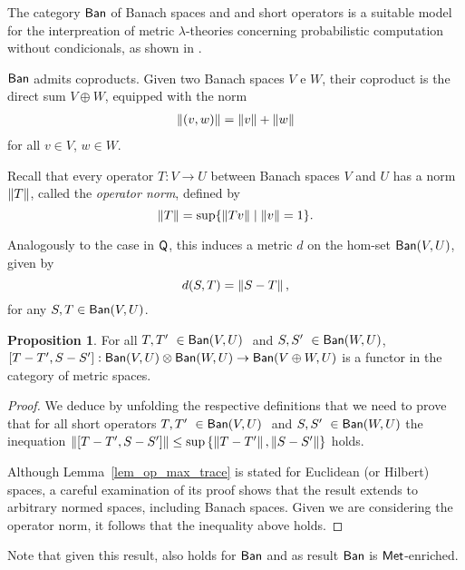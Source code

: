\documentclass[10pt,a4paper]{amsart}
\theoremstyle{definition}
\theoremstyle{definition}
\theoremstyle{definition}
\theoremstyle{definition}
\newtheorem{proposition}[definition]{Proposition}
\theoremstyle{definition}
\theoremstyle{definition}
\begin{document}
  The category $\mathsf{Ban}$ of Banach spaces and and short operators is a suitable model for the interpreation of metric $\lambda$-theories
  concerning probabilistic computation without condicionals, as shown in \cite{dahlqvist2023syntactic}. 
  
  
  $\mathsf{Ban}$ admits coproducts. Given two Banach spaces  $V$ e $W$, their coproduct is the direct sum $V \oplus W$, equipped with the norm
  \begin{align*}
    \left\lVert (v,w) \right\rVert = \left\lVert v \right\rVert+\left\lVert w \right\rVert
  \end{align*}
  for all  $v \in V$, $w \in W$.

  

  Recall that every operator \( T: V \to U \) between Banach spaces \( V \) and \( U \) has a norm \( \left\lVert T \right\rVert \), called the \emph{operator norm}, defined by
  \[
  \left\lVert T \right\rVert = \sup \{ \left\lVert Tv \right\rVert \mid \left\lVert v \right\rVert = 1 \}.
  \]
  
  Analogously to the case in \( \mathsf{Q} \), this induces a metric \( d \) on the hom-set \( \mathsf{Ban}(V, U) \), given by
  \[
  d(S, T) = \left\lVert S - T \right\rVert,
  \]
  for any \( S, T \in \mathsf{Ban}(V, U) \).

  \begin{proposition} \label{prop:met_cond_pp}
    For all $T, T' \in \catBan(V,U)  $ and $S, S' \in \catBan(W,U) $, $[T-T',S-S']:\mathsf{Ban}(V,U) \otimes \mathsf{Ban}(W,U) \rightarrow \mathsf{Ban}(V \oplus W,U) $ is a functor in the category of metric spaces.
  \end{proposition}

  \begin{proof}
    We deduce by unfolding the respective definitions that we need to prove that for all short operators $T, T' \in \catBan(V,U)  $ and $S, S' \in \catBan(W,U) $ the inequation $\left\lVert [T-T', S-S'] \right\rVert \leq  \sup \left\{ \left\lVert T-T' \right\rVert, \left\lVert S-S' \right\rVert \right\}$ holds.

    Although Lemma~\ref{lem_op_max_trace} is stated for Euclidean (or Hilbert) spaces, a careful examination of its proof shows that the result extends to arbitrary normed spaces, including Banach spaces. Given we are considering the operator norm,  it follows that the inequality above  holds.

  \end{proof}
  
  Note that given this result, \cite[Theorem 4.3]{dahlqvist2023syntactic} also holds for $\mathsf{Ban}$ and as result $\mathsf{Ban}$ is $\mathsf{Met}$-enriched.
\end{document}
